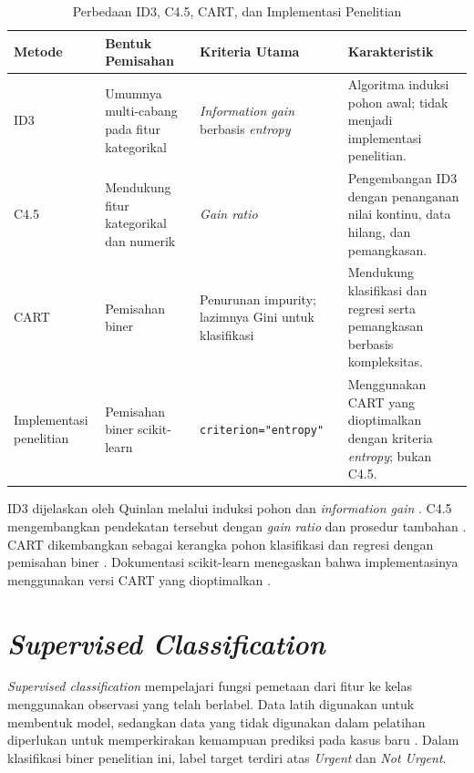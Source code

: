 \begin{table}[htbp]
    \centering
    \caption{Perbedaan ID3, C4.5, CART, dan Implementasi Penelitian}
    \label{tab:perbandingan-algoritma-pohon}
    \small
    \renewcommand{\arraystretch}{1.2}
    \begin{tabularx}{\textwidth}{p{}p{}p{}X}
        \toprule
        \textbf{Metode} & \textbf{Bentuk Pemisahan} & \textbf{Kriteria Utama} & \textbf{Karakteristik} \\
        \midrule
        ID3 & Umumnya multi-cabang pada fitur kategorikal & \textit{Information gain} berbasis \textit{entropy} & Algoritma induksi pohon awal; tidak menjadi implementasi penelitian. \\
        C4.5 & Mendukung fitur kategorikal dan numerik & \textit{Gain ratio} & Pengembangan ID3 dengan penanganan nilai kontinu, data hilang, dan pemangkasan. \\
        CART & Pemisahan biner & Penurunan impurity; lazimnya Gini untuk klasifikasi & Mendukung klasifikasi dan regresi serta pemangkasan berbasis kompleksitas. \\
        Implementasi penelitian & Pemisahan biner scikit-learn & \texttt{criterion="entropy"} & Menggunakan CART yang dioptimalkan dengan kriteria \textit{entropy}; bukan C4.5. \\
        \bottomrule
    \end{tabularx}
\end{table}

ID3 dijelaskan oleh Quinlan melalui induksi pohon dan \textit{information gain} \cite{Quinlan1986}. C4.5 mengembangkan pendekatan tersebut dengan \textit{gain ratio} dan prosedur tambahan \cite{Quinlan1993C45}. CART dikembangkan sebagai kerangka pohon klasifikasi dan regresi dengan pemisahan biner \cite{BreimanEtAl1984}. Dokumentasi scikit-learn menegaskan bahwa implementasinya menggunakan versi CART yang dioptimalkan \cite{ScikitLearnTreeGuide}.

\FloatBarrier

\section{\textit{Supervised Classification}}

\textit{Supervised classification} mempelajari fungsi pemetaan dari fitur ke kelas menggunakan observasi yang telah berlabel. Data latih digunakan untuk membentuk model, sedangkan data yang tidak digunakan dalam pelatihan diperlukan untuk memperkirakan kemampuan prediksi pada kasus baru \cite{JamesEtAl2023}. Dalam klasifikasi biner penelitian ini, label target terdiri atas \textit{Urgent} dan \textit{Not Urgent}.

